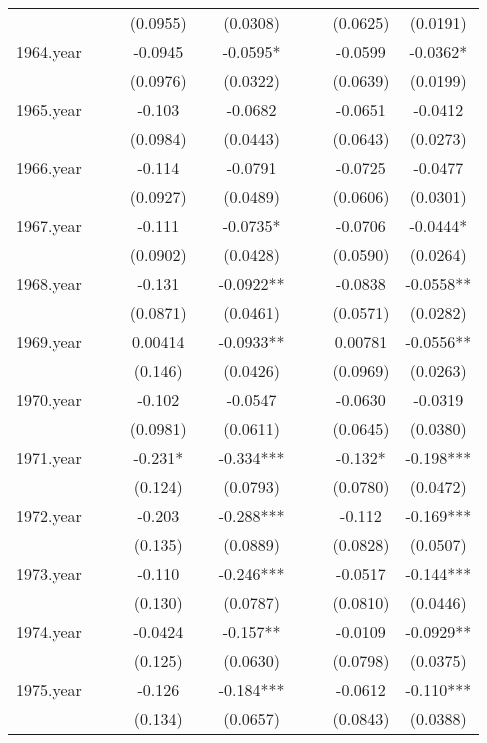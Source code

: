 \documentclass[]{article}
\begin{document}
\begin{tabular}{lccccccccc}
 &  &  & (0.0955) &  & (0.0308) &  &  & (0.0625) & (0.0191) \\
1964.year &  &  & -0.0945 &  & -0.0595* &  &  & -0.0599 & -0.0362* \\
 &  &  & (0.0976) &  & (0.0322) &  &  & (0.0639) & (0.0199) \\
1965.year &  &  & -0.103 &  & -0.0682 &  &  & -0.0651 & -0.0412 \\
 &  &  & (0.0984) &  & (0.0443) &  &  & (0.0643) & (0.0273) \\
1966.year &  &  & -0.114 &  & -0.0791 &  &  & -0.0725 & -0.0477 \\
 &  &  & (0.0927) &  & (0.0489) &  &  & (0.0606) & (0.0301) \\
1967.year &  &  & -0.111 &  & -0.0735* &  &  & -0.0706 & -0.0444* \\
 &  &  & (0.0902) &  & (0.0428) &  &  & (0.0590) & (0.0264) \\
1968.year &  &  & -0.131 &  & -0.0922** &  &  & -0.0838 & -0.0558** \\
 &  &  & (0.0871) &  & (0.0461) &  &  & (0.0571) & (0.0282) \\
1969.year &  &  & 0.00414 &  & -0.0933** &  &  & 0.00781 & -0.0556** \\
 &  &  & (0.146) &  & (0.0426) &  &  & (0.0969) & (0.0263) \\
1970.year &  &  & -0.102 &  & -0.0547 &  &  & -0.0630 & -0.0319 \\
 &  &  & (0.0981) &  & (0.0611) &  &  & (0.0645) & (0.0380) \\
1971.year &  &  & -0.231* &  & -0.334*** &  &  & -0.132* & -0.198*** \\
 &  &  & (0.124) &  & (0.0793) &  &  & (0.0780) & (0.0472) \\
1972.year &  &  & -0.203 &  & -0.288*** &  &  & -0.112 & -0.169*** \\
 &  &  & (0.135) &  & (0.0889) &  &  & (0.0828) & (0.0507) \\
1973.year &  &  & -0.110 &  & -0.246*** &  &  & -0.0517 & -0.144*** \\
 &  &  & (0.130) &  & (0.0787) &  &  & (0.0810) & (0.0446) \\
1974.year &  &  & -0.0424 &  & -0.157** &  &  & -0.0109 & -0.0929** \\
 &  &  & (0.125) &  & (0.0630) &  &  & (0.0798) & (0.0375) \\
1975.year &  &  & -0.126 &  & -0.184*** &  &  & -0.0612 & -0.110*** \\
 &  &  & (0.134) &  & (0.0657) &  &  & (0.0843) & (0.0388) \\

\end{tabular}
\end{document}
